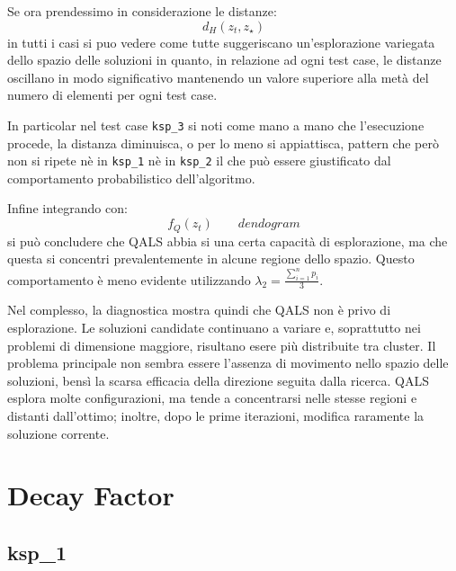\documentclass[a4paper,12pt]{article}
\begin{document}
Se ora prendessimo in considerazione le distanze:
\[
d_H(z_t,z_\star)
\]
in tutti i casi si puo vedere come tutte suggeriscano un'esplorazione variegata dello spazio delle soluzioni in quanto, in relazione ad ogni test case, le distanze oscillano
in modo significativo mantenendo un valore superiore alla metà del numero di elementi per ogni test case. 

In particolar nel test case \texttt{ksp\_3} si noti come mano a mano che l'esecuzione procede, la distanza diminuisca, o per lo meno si appiattisca, pattern che però non si ripete nè 
in \texttt{ksp\_1} nè in \texttt{ksp\_2} il che può essere giustificato dal comportamento probabilistico dell'algoritmo.

Infine integrando con:
\[
f_Q(z_t)
\qquad
dendogram
\]
si può concludere che QALS abbia si una certa capacità di esplorazione, ma che questa si concentri prevalentemente in alcune regione dello spazio. Questo comportamento è meno evidente
utilizzando \(\lambda_2 = \frac{\sum_{i=1}^{n} p_i}{3}.\)

Nel complesso, la diagnostica mostra quindi che QALS non è privo di esplorazione. Le soluzioni candidate continuano a variare e, soprattutto nei problemi di dimensione maggiore, 
risultano esere più distribuite tra cluster. Il problema principale non sembra essere l'assenza di movimento nello spazio delle soluzioni, bensì la scarsa efficacia della direzione seguita
dalla ricerca. QALS esplora molte configurazioni, ma tende a concentrarsi nelle stesse regioni e distanti dall'ottimo; inoltre, dopo le prime iterazioni, modifica raramente la soluzione corrente.

\clearpage
\section{Decay Factor}

\subsection{ksp\_1}
\end{document}
